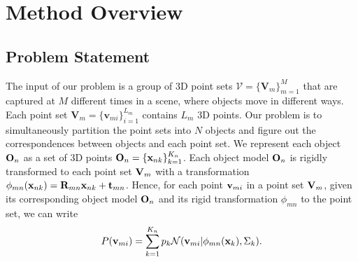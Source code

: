 \section{Method Overview}
\label{sec:method}



\subsection{Problem Statement}

The input of our problem is a group of 3D point sets  $\mathcal{V}=\{\mathbf{V}_m\}^{M}_{m=1}$ that are captured at $M$ different times in a scene, where objects move in different ways. 
%
Each point set $\mathbf{V}_m=\{\mathbf{v}_{mi}\}^{L_m}_{i=1}$ contains $L_m$ 3D points.
%
Our problem is to simultaneously partition the point sets into $N$ objects and figure out the correspondences between objects and each point set.
%
We represent each object $\mathbf{O}_{n}$ as a set of 3D points $\mathbf{O}_{n}=\{\mathbf{x}_{nk}\}^{K_n}_{k=1}$. 
%
Each object model $\mathbf{O}_{n}$ is rigidly transformed to each point set $\mathbf{V}_m$ with a transformation $\phi_{mn}(\mathbf{x}_{nk})=\mathbf{R}_{mn}\mathbf{x}_{nk}+\mathbf{t}_{mn}$.
%
%
Hence, for each point $\mathbf{v}_{mi}$ in a point set $\mathbf{V}_m$, given its corresponding object model $\mathbf{O}_{n}$ and its rigid transformation $\phi_{mn}$ to the point set, we can write
\begin{equation}
\label{equ:model}
P(\mathbf{v}_{mi})=\sum^{K_n}_{k=1}p_{k}\mathcal{N}(\mathbf{v}_{mi}|\phi_{mn}(\mathbf{x}_{k}),\Sigma_{k}).
\end{equation}
%

 
